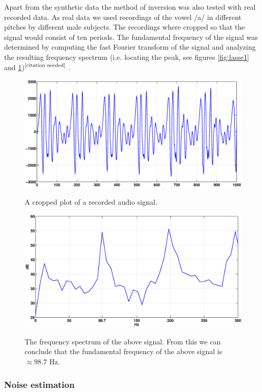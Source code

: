 \documentclass[12pt,a4]{article}
\newcommand{\citeneeded}{\ensuremath{\vphantom{1}^{\text{[citation needed]}}\,}}
\begin{document}
Apart from the synthetic data the method of inversion was also tested with real recorded data. As real data we used recordings of the vowel /a/ in different pitches by different male subjects. The recordings where cropped so that the signal would consist of ten periods. The fundamental frequency of the signal was determined by computing the fast Fourier transform of the signal and analyzing the resulting frequency spectrum (i.e. locating the peak, see figures \ref{fig:lasse1} and \ref{fig:lasse2})\citeneeded.
\begin{figure}[H]
\begin{center}
 \includegraphics[scale=.3]{img/lasse_signal.eps}
 \caption{A cropped plot of a recorded audio signal.}\label{fig:lasse1}
 \includegraphics[scale=.3]{img/lasse_spectrum.eps}
 \caption{The frequency spectrum of the above signal. From this we can conclude that the fundamental frequency of the above signal is $\approx 98.7$ Hz.}\label{fig:lasse2}
\end{center}
\end{figure}

\subsubsection{Noise estimation}
\label{sec:noiseEst}
\end{document}
